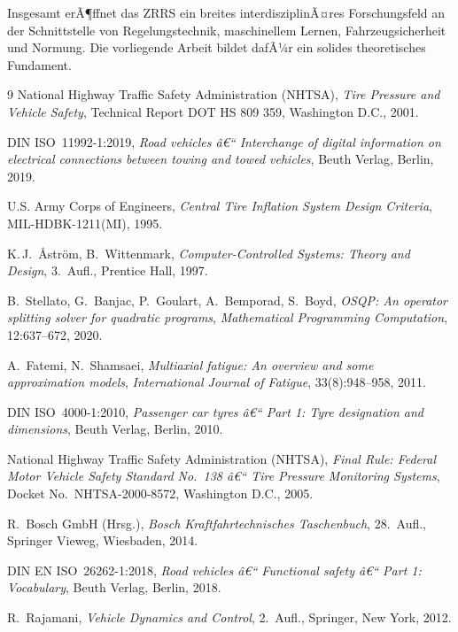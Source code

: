 ﻿\documentclass[a4paper,12pt]{article}
\theoremstyle{definition}
\begin{document}
Insgesamt erÃ¶ffnet das ZRRS ein breites interdisziplinÃ¤res Forschungsfeld
an der Schnittstelle von Regelungstechnik, maschinellem Lernen,
Fahrzeugsicherheit und Normung. Die vorliegende Arbeit bildet dafÃ¼r
ein solides theoretisches Fundament.


\begin{thebibliography}{9}
National Highway Traffic Safety Administration (NHTSA),
\textit{Tire Pressure and Vehicle Safety}, Technical Report DOT HS 809 359,
Washington D.C., 2001.

DIN ISO~11992-1:2019,
\textit{Road vehicles â€“ Interchange of digital information on electrical connections between towing and towed vehicles},
Beuth Verlag, Berlin, 2019.

U.S. Army Corps of Engineers,
\textit{Central Tire Inflation System Design Criteria}, MIL-HDBK-1211(MI),
1995.

K.\,J.~\AA{}str\"{o}m, B.~Wittenmark,
\textit{Computer-Controlled Systems: Theory and Design},
3.~Aufl., Prentice Hall, 1997.

B.~Stellato, G.~Banjac, P.~Goulart, A.~Bemporad, S.~Boyd,
\textit{OSQP: An operator splitting solver for quadratic programs},
\textit{Mathematical Programming Computation}, 12:637--672, 2020.

A.~Fatemi, N.~Shamsaei,
\textit{Multiaxial fatigue: An overview and some approximation models},
\textit{International Journal of Fatigue}, 33(8):948--958, 2011.

DIN ISO~4000-1:2010,
\textit{Passenger car tyres â€“ Part 1: Tyre designation and dimensions},
Beuth Verlag, Berlin, 2010.

National Highway Traffic Safety Administration (NHTSA),
\textit{Final Rule: Federal Motor Vehicle Safety Standard No.~138 â€“ Tire Pressure Monitoring Systems},
Docket No.~NHTSA-2000-8572, Washington D.C., 2005.

R.~Bosch GmbH (Hrsg.),
\textit{Bosch Kraftfahrtechnisches Taschenbuch},
28.~Aufl., Springer Vieweg, Wiesbaden, 2014.

DIN EN ISO~26262-1:2018,
\textit{Road vehicles â€“ Functional safety â€“ Part 1: Vocabulary},
Beuth Verlag, Berlin, 2018.

R.~Rajamani,
\textit{Vehicle Dynamics and Control},
2.~Aufl., Springer, New York, 2012.


\end{thebibliography}
\end{document}
